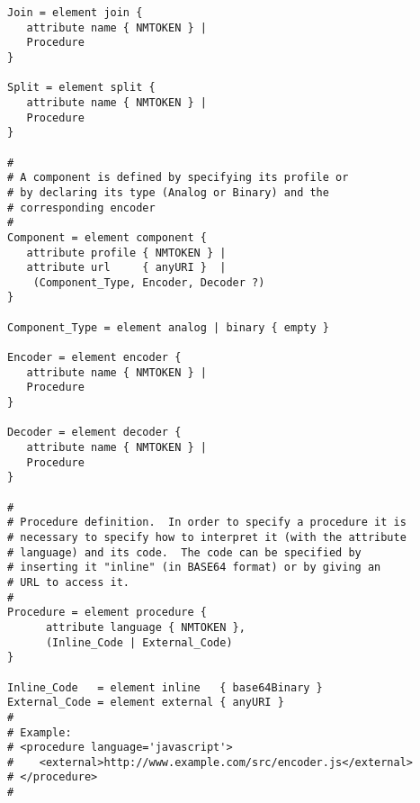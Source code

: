 \documentclass{article}
\begin{document}
\begin{verbatim}
Join = element join {
   attribute name { NMTOKEN } |
   Procedure
}

Split = element split {
   attribute name { NMTOKEN } |
   Procedure
}

#
# A component is defined by specifying its profile or
# by declaring its type (Analog or Binary) and the
# corresponding encoder
#
Component = element component {
   attribute profile { NMTOKEN } |
   attribute url     { anyURI }  |
    (Component_Type, Encoder, Decoder ?)
}

Component_Type = element analog | binary { empty }

Encoder = element encoder {
   attribute name { NMTOKEN } |
   Procedure
}

Decoder = element decoder {
   attribute name { NMTOKEN } |
   Procedure
}

#
# Procedure definition.  In order to specify a procedure it is
# necessary to specify how to interpret it (with the attribute
# language) and its code.  The code can be specified by 
# inserting it "inline" (in BASE64 format) or by giving an 
# URL to access it.
#
Procedure = element procedure {
      attribute language { NMTOKEN },
      (Inline_Code | External_Code)
}

Inline_Code   = element inline   { base64Binary }
External_Code = element external { anyURI }
#
# Example:
# <procedure language='javascript'>
#    <external>http://www.example.com/src/encoder.js</external>
# </procedure>
#
\end{verbatim}




\end{document}
